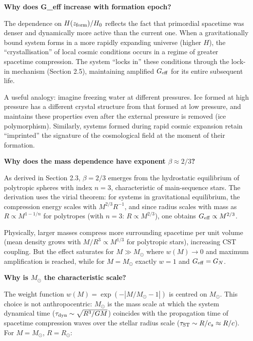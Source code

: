 \documentclass[11pt,a4paper]{article}
\begin{document}
\textbf{Why does G\_eff increase with formation epoch?}

The dependence on \(H(z_{\rm form})/H_0\) reflects the fact that
primordial spacetime was denser and dynamically more active than the
current one. When a gravitationally bound system forms in a more rapidly
expanding universe (higher \(H\)), the ``crystallisation'' of local
cosmic conditions occurs in a regime of greater spacetime compression.
The system ``locks in'' these conditions through the lock-in mechanism
(Section 2.5), maintaining amplified \(G_{\rm eff}\) for its entire
subsequent life.

A useful analogy: imagine freezing water at different pressures. Ice
formed at high pressure has a different crystal structure from that
formed at low pressure, and maintains these properties even after the
external pressure is removed (ice polymorphism). Similarly, systems
formed during rapid cosmic expansion retain ``imprinted'' the signature
of the cosmological field at the moment of their formation.

\textbf{Why does the mass dependence have exponent
\(\beta \approx 2/3\)?}

As derived in Section 2.3, \(\beta = 2/3\) emerges from the hydrostatic
equilibrium of polytropic spheres with index \(n=3\), characteristic of
main-sequence stars. The derivation uses the virial theorem: for systems
in gravitational equilibrium, the compression energy scales with
\(M^{2/3} R^{-1}\), and since radius scales with mass as
\(R \propto M^{1-1/n}\) for polytropes (with \(n=3\):
\(R \propto M^{2/3}\)), one obtains \(G_{\rm eff} \propto M^{2/3}\).

Physically, larger masses compress more surrounding spacetime per unit
volume (mean density grows with \(M/R^3 \propto M^{1/3}\) for polytropic
stars), increasing CST coupling. But the effect saturates for
\(M \gg M_\odot\) where \(w(M) \to 0\) and maximum amplification is
reached, while for \(M = M_\odot\) exactly \(w = 1\) and
\(G_{\rm eff} = G_N\).

\textbf{Why is \(M_\odot\) the characteristic scale?}

The weight function \(w(M) = \exp(-|M/M_\odot - 1|)\) is centred on
\(M_\odot\). This choice is not anthropocentric: \(M_\odot\) is the mass
scale at which the system dynamical time
(\(\tau_{\rm dyn} \sim \sqrt{R^3/GM}\)) coincides with the propagation
time of spacetime compression waves over the stellar radius scale
(\(\tau_{\rm ST} \sim R/c_s \approx R/c\)). For \(M = M_\odot\),
\(R = R_\odot\):
\end{document}
